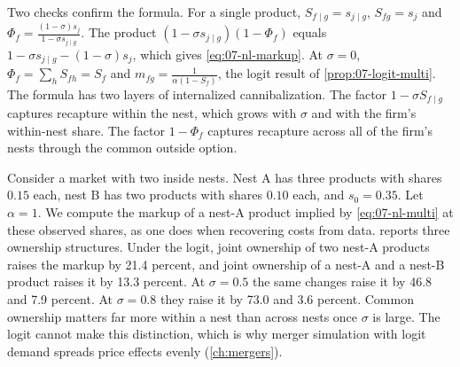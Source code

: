 Two checks confirm the formula. For a single product, $S_{f \mid g} = s_{j \mid g}$, $S_{fg} = s_j$ and
$\Phi_f = \frac{(1-\sigma)s_j}{1 - \sigma s_{j \mid g}}$. The product
$(1 - \sigma s_{j \mid g})(1 - \Phi_f)$ equals $1 - \sigma s_{j \mid g} - (1-\sigma)s_j$, which gives
\eqref{eq:07-nl-markup}. At $\sigma = 0$, $\Phi_f = \sum_h S_{fh} = S_f$ and $m_{fg} = \frac{1}{\alpha(1 - S_f)}$, the
logit result of \cref{prop:07-logit-multi}. The formula has two layers of internalized cannibalization. The
factor $1 - \sigma S_{f \mid g}$ captures recapture within the nest, which grows with $\sigma$ and with the firm's
within-nest share. The factor $1 - \Phi_f$ captures recapture across all of the firm's nests through the common
outside option.

\begin{example}\label{ex:07-nl-markups}
Consider a market with two inside nests. Nest A has three products with shares $0.15$ each, nest B has two products
with shares $0.10$ each, and $s_0 = 0.35$. Let $\alpha = 1$. We compute the markup of a nest-A product implied by
\eqref{eq:07-nl-multi} at these observed shares, as one does when recovering costs from data.
 reports three ownership structures. Under the logit, joint ownership of two nest-A
products raises the markup by 21.4 percent, and joint ownership of a nest-A and a nest-B product raises it by
13.3 percent. At $\sigma = 0.5$ the same changes raise it by 46.8 and 7.9 percent. At $\sigma = 0.8$ they raise it
by 73.0 and 3.6 percent. Common ownership matters far more within a nest than across nests once $\sigma$ is large.
The logit cannot make this distinction, which is why merger simulation with logit demand spreads price effects
evenly (\cref{ch:mergers}).
\end{example}

